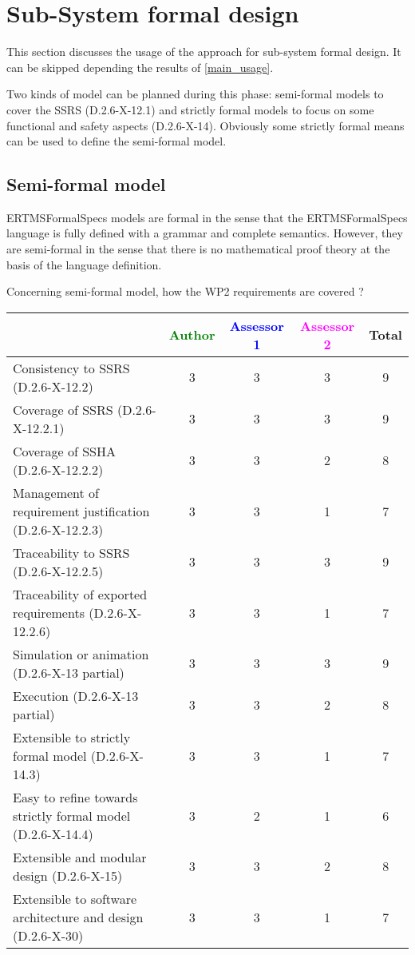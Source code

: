 \section{Sub-System formal design}
This section discusses the usage of the approach for sub-system formal design.
It can be skipped depending the results of \ref{main_usage}.

Two kinds of model can be planned during this phase: semi-formal models to  cover the SSRS (D.2.6-X-12.1) and strictly formal  models to  focus on some functional and safety aspects (D.2.6-X-14). Obviously some strictly  formal means can be used to define the semi-formal  model.

\subsection{Semi-formal model}

\begin{author_comment}
ERTMSFormalSpecs models are formal in the sense that the ERTMSFormalSpecs language is fully defined with a grammar and complete semantics. However, they are semi-formal in the sense that there is no mathematical proof theory at the basis of the language definition.  
\end{author_comment}

Concerning semi-formal model, how the WP2 requirements are covered ?

\begin{tabular}{|l | c | c | c | c|}
\hline
& \textcolor{green}{Author} & \textcolor{blue}{Assessor 1} & \textcolor{magenta}{Assessor 2} & Total \\
\hline 
Consistency to SSRS (D.2.6-X-12.2) & 3 & 3 & 3 & 9 \\
\hline
Coverage of SSRS (D.2.6-X-12.2.1)  & 3 & 3 & 3 & 9 \\
\hline
Coverage of SSHA (D.2.6-X-12.2.2)  & 3 & 3 & 2 & 8  \\
\hline
Management of requirement justification (D.2.6-X-12.2.3)  & 3 & 3 & 1 & 7  \\
\hline
Traceability to  SSRS (D.2.6-X-12.2.5)  & 3 & 3 & 3 & 9  \\
\hline
Traceability of exported requirements (D.2.6-X-12.2.6)  & 3 & 3 & 1 & 7  \\
\hline
Simulation or animation (D.2.6-X-13 partial)  & 3 & 3 & 3 & 9  \\
\hline
Execution (D.2.6-X-13 partial)  & 3 & 3 & 2 & 8  \\
\hline
Extensible to strictly formal model (D.2.6-X-14.3) & 3 & 3 & 1 & 7 \\
\hline
Easy to refine towards strictly formal model (D.2.6-X-14.4) & 3 & 2 & 1 & 6  \\
\hline
Extensible and modular design (D.2.6-X-15)  & 3 & 3 & 2 & 8  \\
\hline
Extensible to software architecture and design (D.2.6-X-30)   & 3 & 3 & 1 & 7  \\
\hline
\end{tabular}


